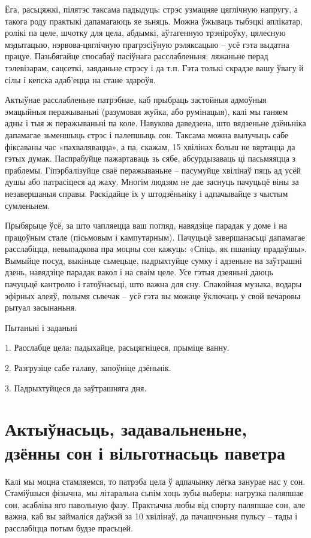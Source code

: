 Ёга, расьцяжкі, пілятэс таксама падыдуць: стрэс узмацняе цяглічную напругу, а такога роду практыкі дапамагаюць яе зьняць. Можна ўжываць тыбэцкі аплікатар, ролікі па целе, шчотку для цела, абдымкі, аўтагенную трэніроўку, цялесную мэдытацыю, нэрвова-цяглічную прагрэсіўную рэляксацыю – усё гэта выдатна працуе. Пазьбягайце спосабаў пасіўнага расслабленьня: ляжаньне перад тэлевізарам, сацсеткі, заяданьне стрэсу і да т.п. Гэта толькі скрадзе вашу ўвагу й сілы і кепска адаб'ецца на стане здароўя.

Актыўнае расслабленьне патрэбнае, каб прыбраць застойныя адмоўныя эмацыйныя перажываньні (разумовая жуйка, або румінацыя), калі мы ганяем адны і тыя ж перажываньні па коле. Навукова даведзена, што вядзеньне дзёньніка дапамагае зьменшыць стрэс і палепшыць сон. Таксама можна вылучыць сабе фіксаваны час «пахвалявацца», а па, скажам, 15 хвілінах больш не вяртацца да гэтых думак. Паспрабуйце пажартаваць зь сябе, абсурдызаваць ці пасьмяяцца з праблемы. Гіпэрбалізуйце сваё перажываньне – пасумуйце хвілінаў пяць ад усёй душы або патрасіцеся ад жаху. Многім людзям не дае заснуць пачуцьцё віны за незавершаныя справы. Раскідайце іх у штодзёньніку і адпачывайце з чыстым сумленьнем.

Прыбярыце ўсё, за што чапляецца ваш погляд, навядзіце парадак у доме і на працоўным стале (пісьмовым і кампутарным). Пачуцьцё завершанасьці дапамагае расслабіцца, невыпадкова пра моцны сон кажуць: «Спіць, як пшаніцу прадаўшы». Вымыйце посуд, выкіньце сьмецьце, падрыхтуйце сумку і адзеньне на заўтрашні дзень, навядзіце парадак вакол і на сваім целе. Усе гэтыя дзеяньні даюць пачуцьцё кантролю і гатоўнасьці, што важна для сну. Спакойная музыка, водары эфірных алеяў, полымя сьвечак – усё гэта вы можаце ўключаць у свой вечаровы рытуал засынаньня.

Пытаньні і заданьні

1. Расслабце цела: падыхайце, расьцягніцеся, прыміце ванну.

2. Разгрузіце сабе галаву, запоўніце дзёньнік.

3. Падрыхтуйцеся да заўтрашняга дня.


\section{Актыўнасьць, задавальненьне, дзённы сон і вільготнасьць паветра}

Калі мы моцна стамляемся, то патрэба цела ў адпачынку лёгка занурае нас у сон. Стаміўшыся фізычна, мы літаральна сьпім хоць зубы выберы: нагрузка паляпшае сон, асабліва яго павольную фазу. Практычна любы від спорту паляпшае сон, але важна, каб вы займаліся даўжэй за 10 хвілінаў, да пачашчэньня пульсу – тады і расслабіцца потым будзе прасьцей.

